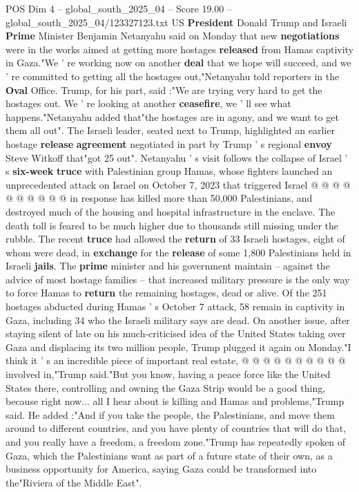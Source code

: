 \begin{textsample}{POS Dim 4 – global\_south\_2025\_04 – Score 19.00 – global\_south\_2025\_04/123327123.txt}  \label{ex:f4_pos_228}
US \textbf{President} Donald Trump and Israeli \textbf{Prime} Minister Benjamin Netanyahu said on Monday that new \textbf{negotiations} were in the works aimed at getting more hostages \textbf{released} from Hamas captivity in Gaza."We ' re working now on another \textbf{deal} that we hope will succeed, and we ' re committed to getting all the hostages out,"Netanyahu told reporters in the \textbf{Oval} Office.
Trump, for his part, said :"We are trying very hard to get the hostages out.
We ' re looking at another \textbf{ceasefire}, we ' ll see what happens."Netanyahu added that"the hostages are in agony, and we want to get them all out".
The Israeli leader, seated next to Trump, highlighted an earlier hostage \textbf{release} \textbf{agreement} negotiated in part by Trump ' s regional \textbf{envoy} Steve Witkoff that"got 25 out".
Netanyahu ' s visit follows the collapse of Israel ' s \textbf{six-week} \textbf{truce} with Palestinian group Hamas, whose fighters launched an unprecedented attack on Israel on October 7, 2023 that triggered Israel @ @ @ @ @ @ @ @ @ @ in response has killed more than 50,000 Palestinians, and destroyed much of the housing and hospital infrastructure in the enclave.
The death toll is feared to be much higher due to thousands still missing under the rubble.
The recent \textbf{truce} had allowed the \textbf{return} of 33 Israeli hostages, eight of whom were dead, in \textbf{exchange} for the \textbf{release} of some 1,800 Palestinians held in Israeli \textbf{jails}.
The \textbf{prime} minister and his government maintain -- against the advice of most hostage families -- that increased military pressure is the only way to force Hamas to \textbf{return} the remaining hostages, dead or alive.
Of the 251 hostages abducted during Hamas ' s October 7 attack, 58 remain in captivity in Gaza, including 34 who the Israeli military says are dead.
On another issue, after staying silent of late on his much-criticised idea of the United States taking over Gaza and displacing its two million people, Trump plugged it again on Monday."I think it ' s an incredible piece of important real estate, @ @ @ @ @ @ @ @ @ @ involved in,"Trump said."But you know, having a peace force like the United States there, controlling and owning the Gaza Strip would be a good thing, because right now... all I hear about is killing and Hamas and problems,"Trump said.
He added :"And if you take the people, the Palestinians, and move them around to different countries, and you have plenty of countries that will do that, and you really have a freedom, a freedom zone."Trump has repeatedly spoken of Gaza, which the Palestinians want as part of a future state of their own, as a business opportunity for America, saying Gaza could be transformed into the"Riviera of the Middle East".

\end{textsample}
